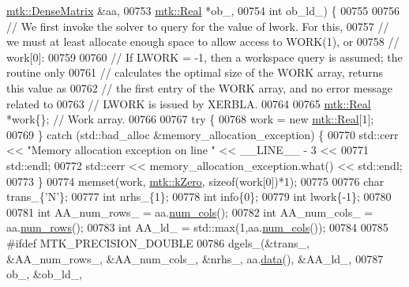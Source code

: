 \begin{DoxyCode}
      \hyperlink{classmtk_1_1DenseMatrix}{mtk::DenseMatrix} &aa,
00753                                                    \hyperlink{group__c01-roots_gac080bbbf5cbb5502c9f00405f894857d}{mtk::Real} *ob\_,
00754                                                    \textcolor{keywordtype}{int} ob\_ld\_) \{
00755 
00756   \textcolor{comment}{// We first invoke the solver to query for the value of lwork. For this,}
00757   \textcolor{comment}{// we must at least allocate enough space to allow access to WORK(1), or}
00758   \textcolor{comment}{// work[0]:}
00759 
00760   \textcolor{comment}{// If LWORK = -1, then a workspace query is assumed; the routine only}
00761   \textcolor{comment}{// calculates the optimal size of the WORK array, returns this value as}
00762   \textcolor{comment}{// the first entry of the WORK array, and no error message related to}
00763   \textcolor{comment}{// LWORK is issued by XERBLA.}
00764 
00765   \hyperlink{group__c01-roots_gac080bbbf5cbb5502c9f00405f894857d}{mtk::Real} *work\{\}; \textcolor{comment}{// Work array.}
00766 
00767   \textcolor{keywordflow}{try} \{
00768     work = \textcolor{keyword}{new} \hyperlink{group__c01-roots_gac080bbbf5cbb5502c9f00405f894857d}{mtk::Real}[1];
00769   \} \textcolor{keywordflow}{catch} (std::bad\_alloc &memory\_allocation\_exception) \{
00770     std::cerr << \textcolor{stringliteral}{"Memory allocation exception on line "} << \_\_LINE\_\_ - 3 <<
00771       std::endl;
00772     std::cerr << memory\_allocation\_exception.what() << std::endl;
00773   \}
00774   memset(work, \hyperlink{group__c01-roots_ga59a451a5fae30d59649bcda274fea271}{mtk::kZero}, \textcolor{keyword}{sizeof}(work[0])*1);
00775 
00776   \textcolor{keywordtype}{char} trans\_\{\textcolor{charliteral}{'N'}\};
00777   \textcolor{keywordtype}{int} nrhs\_\{1\};
00778   \textcolor{keywordtype}{int} info\{0\};
00779   \textcolor{keywordtype}{int} lwork\{-1\};
00780 
00781   \textcolor{keywordtype}{int} AA\_num\_rows\_  = aa.\hyperlink{classmtk_1_1DenseMatrix_a41747502d468c6728a4be31501b16e0e}{num\_cols}();
00782   \textcolor{keywordtype}{int} AA\_num\_cols\_  = aa.\hyperlink{classmtk_1_1DenseMatrix_a53f3afb3b6a8d21854458aaa9663cc74}{num\_rows}();
00783   \textcolor{keywordtype}{int} AA\_ld\_ = std::max(1,aa.\hyperlink{classmtk_1_1DenseMatrix_a41747502d468c6728a4be31501b16e0e}{num\_cols}());
00784 
00785 \textcolor{preprocessor}{  #ifdef MTK\_PRECISION\_DOUBLE}
00786   dgels\_(&trans\_, &AA\_num\_rows\_, &AA\_num\_cols\_, &nrhs\_, aa.\hyperlink{classmtk_1_1DenseMatrix_a0c33b8a9e01d157c61ddbdf807c25d84}{data}(), &AA\_ld\_,
00787          ob\_, &ob\_ld\_,

\end{DoxyCode}
